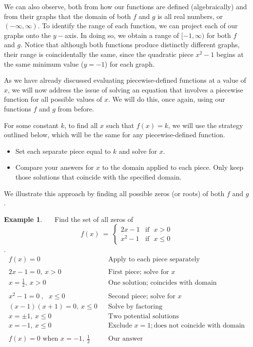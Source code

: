 \documentclass[12pt]{book}
\theoremstyle{definition}
\newtheorem{example}{Example}
\begin{document}
We can also observe, both from how our functions are defined (algebraically) and from their graphs that the domain of both $f$ and $g$ is all real numbers, or $(-\infty,\infty)$.  To identify the range of each function, we can project each of our graphs onto the $y-$axis.  In doing so, we obtain a range of $[-1,\infty)$ for both $f$ and $g$.  Notice that although both functions produce distinctly different graphs, their range is coincidentally the same, since the quadratic piece $x^2-1$ begins at the same minimum value ($y=-1$) for each graph.\par
As we have already discussed evaluating piecewise-defined functions at a value of $x$, we will now address the issue of solving an equation that involves a piecewise function for all possible values of $x$.  We will do this, once again, using our functions $f$ and $g$ from before.\par
For some constant $k$, to find all $x$ such that $f(x)=k$, we will use the strategy outlined below, which will be the same for any piecewise-defined function.
	\begin{itemize}
		\item Set each separate piece equal to $k$ and solve for $x$.
		\item Compare your answers for $x$ to the domain applied to each piece.  Only keep those solutions that coincide with the specified domain.
	\end{itemize}
We illustrate this approach by finding all possible zeros (or roots) of both $f$ and $g$.
\begin{example}~~~Find the set of all zeros of \[ f(x)~=~
	\begin{cases} 
      2x-1 & \text{if~~} x> 0\\
			x^2-1 & \text{if~~} x\leq 0
  \end{cases}
\].
\begin{eqnarray*}
	f(x)=0~~~~~ & &\text{Apply~to~each~piece~separately}\\
&&\\
	2x-1=0,~x>0 & &\text{First~piece;~solve~for~}x\\
	x=\frac{1}{2},~x>0 & & \text{One~solution;~coincides~with~domain}\\
	& &\\
	x^2-1=0~,~~~x\leq 0 & &\text{Second~piece;~solve~for~}x\\
	(x-1)(x+1)=0,~x\leq 0 & & \text{Solve~by~factoring}\\
	x=\pm 1,~x\leq 0 & & \text{Two~potential~solutions}\\
	x=-1,~x\leq 0 & &\text{Exclude~} x=1; \text{does~not~coincide~with~domain}\\
	& &\\
	f(x)=0 \text{~when~} x=-1,~ \frac{1}{2} & & \text{Our~answer}
\end{eqnarray*}
\end{example} 
\end{document}
